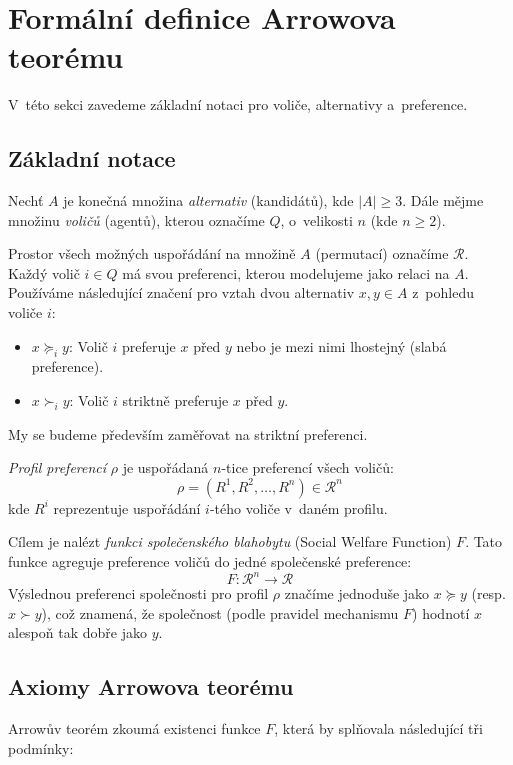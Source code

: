 \documentclass[a4paper, 11pt]{article}
\begin{document}
\section{Formální definice Arrowova teorému}

V~této sekci zavedeme základní notaci pro voliče, alternativy a~preference.

\subsection{Základní notace}

Nechť $A$ je konečná množina \emph{alternativ} (kandidátů), kde $|A| \ge 3$.
Dále mějme množinu \emph{voličů} (agentů), kterou označíme $Q$, o~velikosti $n$ (kde $n \ge 2$).

Prostor všech možných uspořádání na množině $A$ (permutací) označíme $\mathcal{R}$.
Každý volič $i \in Q$ má svou preferenci, kterou modelujeme jako relaci na $A$.
Používáme následující značení pro vztah dvou alternativ $x, y \in A$ z~pohledu voliče $i$:
\begin{itemize}
    \item $x \succeq_i y$: Volič $i$ preferuje $x$ před $y$ nebo je mezi nimi lhostejný (slabá preference).
    \item $x \succ_i y$: Volič $i$ striktně preferuje $x$ před $y$.
\end{itemize}
My se budeme především zaměřovat na striktní preferenci.

\emph{Profil preferencí} $\rho$ je uspořádaná $n$-tice preferencí všech voličů:
\[
    \rho = (R^1, R^2, \dots, R^n) \in \mathcal{R}^n
\]
kde $R^i$ reprezentuje uspořádání $i$-tého voliče v~daném profilu.

Cílem je nalézt \emph{funkci společenského blahobytu} (Social Welfare Function) $F$.
Tato funkce agreguje preference voličů do jedné společenské preference:
\[
    F \colon \mathcal{R}^n \to \mathcal{R}
\]
Výslednou preferenci společnosti pro profil $\rho$ značíme jednoduše jako $x \succeq y$ (resp. $x \succ y$), což znamená, že společnost (podle pravidel mechanismu $F$) hodnotí $x$ alespoň tak dobře jako $y$.

\subsection{Axiomy Arrowova teorému}

Arrowův teorém zkoumá existenci funkce $F$, která by splňovala následující tři podmínky:
\end{document}
